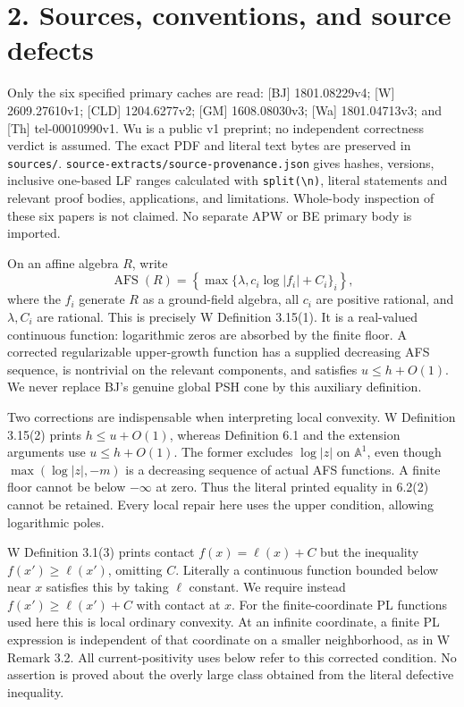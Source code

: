 \documentclass[
  10pt,
]{article}
\begin{document}
\section{2. Sources, conventions, and source
defects}\label{sources-conventions-and-source-defects}

Only the six specified primary caches are read: {[}BJ{]} 1801.08229v4;
{[}W{]} 2609.27610v1; {[}CLD{]} 1204.6277v2; {[}GM{]} 1608.08030v3;
{[}Wa{]} 1801.04713v3; and {[}Th{]} tel-00010990v1. Wu is a public v1
preprint; no independent correctness verdict is assumed. The exact PDF
and literal text bytes are preserved in \texttt{sources/}.
\texttt{source-extracts/source-provenance.json} gives hashes, versions,
inclusive one-based LF ranges calculated with
\texttt{split(\textquotesingle{}\textbackslash{}n\textquotesingle{})},
literal statements and relevant proof bodies, applications, and
limitations. Whole-body inspection of these six papers is not claimed.
No separate APW or BE primary body is imported.

On an affine algebra \(R\), write
\[\operatorname{AFS}(R)=\left\{\max\{\lambda,c_i\log|f_i|+C_i\}_i\right\},\]
where the \(f_i\) generate \(R\) as a ground-field algebra, all \(c_i\)
are positive rational, and \(\lambda,C_i\) are rational. This is
precisely W Definition 3.15(1). It is a real-valued continuous function:
logarithmic zeros are absorbed by the finite floor. A corrected
regularizable upper-growth function has a supplied decreasing AFS
sequence, is nontrivial on the relevant components, and satisfies
\(u\le h+O(1)\). We never replace BJ's genuine global PSH cone by this
auxiliary definition.

Two corrections are indispensable when interpreting local convexity. W
Definition 3.15(2) prints \(h\le u+O(1)\), whereas Definition 6.1 and
the extension arguments use \(u\le h+O(1)\). The former excludes
\(\log|z|\) on \(\mathbb A^1\), even though \(\max(\log|z|,-m)\) is a
decreasing sequence of actual AFS functions. A finite floor cannot be
below \(-\infty\) at zero. Thus the literal printed equality in 6.2(2)
cannot be retained. Every local repair here uses the upper condition,
allowing logarithmic poles.

W Definition 3.1(3) prints contact \(f(x)=\ell(x)+C\) but the inequality
\(f(x')\ge\ell(x')\), omitting \(C\). Literally a continuous function
bounded below near \(x\) satisfies this by taking \(\ell\) constant. We
require instead \(f(x')\ge\ell(x')+C\) with contact at \(x\). For the
finite-coordinate PL functions used here this is local ordinary
convexity. At an infinite coordinate, a finite PL expression is
independent of that coordinate on a smaller neighborhood, as in W Remark
3.2. All current-positivity uses below refer to this corrected
condition. No assertion is proved about the overly large class obtained
from the literal defective inequality.
\end{document}
